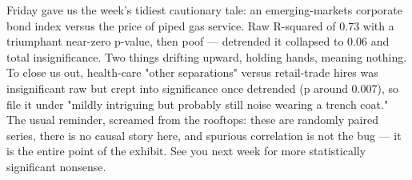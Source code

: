 Friday gave us the week's tidiest cautionary tale: an emerging-markets corporate bond index versus the price of piped gas service. Raw R-squared of 0.73 with a triumphant near-zero p-value, then poof — detrended it collapsed to 0.06 and total insignificance. Two things drifting upward, holding hands, meaning nothing. To close us out, health-care "other separations" versus retail-trade hires was insignificant raw but crept into significance once detrended (p around 0.007), so file it under "mildly intriguing but probably still noise wearing a trench coat." The usual reminder, screamed from the rooftops: these are randomly paired series, there is no causal story here, and spurious correlation is not the bug — it is the entire point of the exhibit. See you next week for more statistically significant nonsense.
